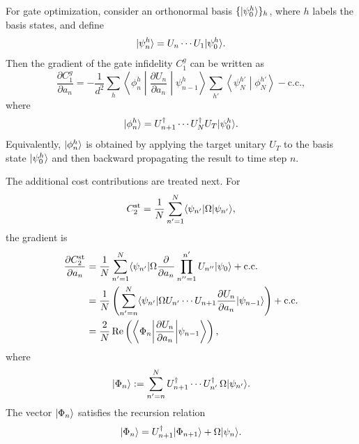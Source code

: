 For gate optimization, consider an orthonormal basis $\{|\psi_0^h\rangle\}_h$, where $h$ labels the basis states, and define
\begin{equation}
|\psi_n^h\rangle=U_n\cdots U_1 |\psi_0^h\rangle.
\end{equation}
Then the gradient of the gate infidelity $C_1^g$ can be written as
\begin{equation}
\label{gategradient}
\frac{\partial C_1^g}{\partial a_n}
=
-\frac{1}{d^2}
\sum_h
\left\langle \phi_n^h \middle| \frac{\partial U_n}{\partial a_n} \middle| \psi_{n-1}^h \right\rangle
\sum_{h'}
\left\langle \psi_N^{h'} \middle| \phi_N^{h'} \right\rangle
-\mathrm{c.c.},
\end{equation}
where
\begin{equation}
|\phi_n^h\rangle
=
U_{n+1}^\dagger \cdots U_N^\dagger U_T |\psi_0^h\rangle.
\end{equation}
Equivalently, $|\phi_n^h\rangle$ is obtained by applying the target unitary $U_T$ to the basis state $|\psi_0^h\rangle$ and then backward propagating the result to time step $n$.

The additional cost contributions are treated next. For
\begin{equation}
C_2^{\mathrm{st}}
=
\frac{1}{N}\sum_{n'=1}^N \langle\psi_{n'}|\Omega |\psi_{n'}\rangle,
\end{equation}
the gradient is
\begin{align}
\frac{\partial C_2^{\mathrm{st}}}{\partial a_n}
&=
\frac{1}{N}\sum_{n'=1}^N
\langle\psi_{n'}|\Omega
\frac{\partial}{\partial a_n}
\prod_{n''=1}^{n'} U_{n''}|\psi_0\rangle
+\mathrm{c.c.}
\nonumber\\
&=
\frac{1}{N}
\left(
\sum_{n'=n}^N
\langle\psi_{n'}|
\Omega
U_{n'}\cdots U_{n+1}
\frac{\partial U_n}{\partial a_n}
|\psi_{n-1}\rangle
\right)
+\mathrm{c.c.}
\nonumber\\
\label{C2stgrad}
&=
\frac{2}{N}
\operatorname{Re}\left(
\left\langle \Phi_n \middle| \frac{\partial U_n}{\partial a_n} \middle| \psi_{n-1} \right\rangle
\right),
\end{align}
where
\begin{equation}
|\Phi_n\rangle
:=
\sum_{n'=n}^N
U_{n+1}^\dagger \cdots U_{n'}^\dagger \,
\Omega |\psi_{n'}\rangle.
\end{equation}
The vector $|\Phi_n\rangle$ satisfies the recursion relation
\begin{equation}
|\Phi_n\rangle
=
U_{n+1}^\dagger |\Phi_{n+1}\rangle
+
\Omega |\psi_n\rangle.
\end{equation}

